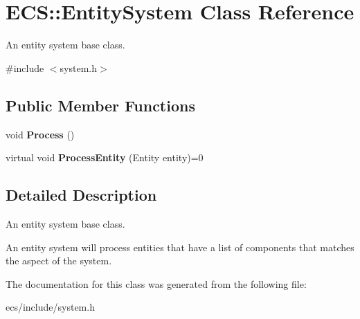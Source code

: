 \hypertarget{class_e_c_s_1_1_entity_system}{\section{E\-C\-S\-:\-:Entity\-System Class Reference}
\label{class_e_c_s_1_1_entity_system}
}


An entity system base class.  




{\ttfamily \#include $<$system.\-h$>$}

\subsection*{Public Member Functions}
\begin{DoxyCompactItemize}
\item 
\hypertarget{class_e_c_s_1_1_entity_system_a9f67d3f6c3b997a164665f1a36e19f0d}{void {\bfseries Process} ()}\label{class_e_c_s_1_1_entity_system_a9f67d3f6c3b997a164665f1a36e19f0d}

\item 
\hypertarget{class_e_c_s_1_1_entity_system_a5f2443358fcbe4ddd7c2bfb46d75cd86}{virtual void {\bfseries Process\-Entity} (Entity entity)=0}\label{class_e_c_s_1_1_entity_system_a5f2443358fcbe4ddd7c2bfb46d75cd86}

\end{DoxyCompactItemize}


\subsection{Detailed Description}
An entity system base class. 

An entity system will process entities that have a list of components that matches the aspect of the system. 

The documentation for this class was generated from the following file\-:\begin{DoxyCompactItemize}
\item 
ecs/include/system.\-h\end{DoxyCompactItemize}
